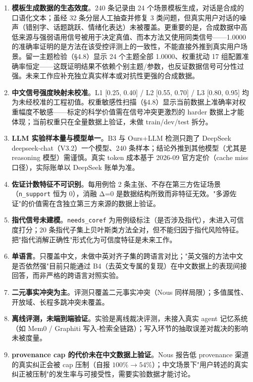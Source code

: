 \documentclass{article}
\begin{document}
\begin{enumerate}
\item \textbf{模板生成数据的生态效度}。240 条记录由 24 个场景模板生成，对话是合成的口语化文本；虽经 32 条分层人工抽查并修复 3 类问题，但真实用户对话的噪声（错别字、话题跳跃、情绪化表达）未被覆盖。更重要的是，合成数据中高低来源与强弱语用信号被用于决定真值、而本方法又使用同类信号——1.0000 的准确率证明的是方法在该受控评测上的一致性，不能直接外推到真实用户场景。留一主题检验（§4.8）显示 24 个主题全部 1.0000、权重扰动 17 组配置准确率恒定——这既证明结果不依赖个别主题/参数，也反证数据信号可分性过强。未来工作应补充独立真实样本或对抗性更强的合成数据。
\item \textbf{中文信号强度映射未校准}。L1 [0.25, 0.40] / L2 [0.55, 0.70] / L3 [0.80, 0.95] 均为未经校准的工程初值。权重敏感性扫描（§4.8）显示当前数据上准确率对权重幅度不敏感——标定的科学价值需在信号冲突更激烈的 harder 数据上才能体现；当前权重只在全量数据上验证，未做 train/dev/test 拆分。
\item \textbf{LLM 实验样本量与模型单一}。B3 与 Ours+LLM 检测只跑了 DeepSeek deepseek-chat（V3.2）一个模型、240 条样本；结论外推到其他模型（尤其是 reasoning 模型）需谨慎。真实 token 成本基于 2026-09 官方定价（cache miss 口径），实际账单以 DeepSeek 账单为准。
\item \textbf{佐证计数特征不可识别}。每用例恰 2 条主张、不存在第三方佐证场景（\texttt{n\_support} 恒为 0），消融 Δ=0 是数据结构所致而非特征无效。"多源佐证"的价值需在含独立第三方来源的数据上验证。
\item \textbf{指代信号未建模}。\texttt{needs\_coref} 为用例级标注（是否涉及指代），未进入可信度打分；20 条指代子集上贝叶斯类方法全对，但不能归因于指代风险特征。把"指代消解正确性"形式化为可信度特征是未来工作。
\item \textbf{单语言}。只覆盖中文，未做中英对齐子集的跨语言对比；"英文强的方法中文是否依然强"目前只能通过 B4（去英文专属的复现）在中文数据上的表现间接回答，而非严格的跨语言对照实验。
\item \textbf{二元事实冲突为主}。评测只覆盖二元事实冲突（Nous 同样局限）；多值属性、开放域、长程多跳冲突未覆盖。
\item \textbf{离线评测，未端到端验证}。实验是离线裁决评测，未接入真实 agent 记忆系统（如 Mem0 / Graphiti 写入-检索全链路）；写入环节的抽取误差对裁决的影响未被度量。
\item \textbf{provenance cap 的代价未在中文数据上验证}。Nous 报告低 provenance 渠道的真实纠正会被 cap 压制（自报 $100\%\to 54\%$）；中文场景下"用户转述的真实纠正被压制"的发生率与可接受性，需要实验数据才能讨论。
\end{enumerate}
\end{document}
